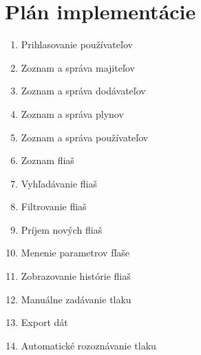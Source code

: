 \documentclass{zah}
\begin{document}
\section{Plán implementácie}

\begin{enumerate}
	\item Prihlasovanie používateľov
	\item Zoznam a správa majiteľov
	\item Zoznam a správa dodávateľov
	\item Zoznam a správa plynov
	\item Zoznam a správa používateľov
	\item Zoznam fliaš
	\item Vyhľadávanie fliaš
	\item Filtrovanie fliaš
	\item Príjem nových fliaš
	\item Menenie parametrov fľaše
	\item Zobrazovanie histórie fliaš
	\item Manuálne zadávanie tlaku
	\item Export dát
	\item Automatické rozoznávanie tlaku
\end{enumerate}
\end{document}
